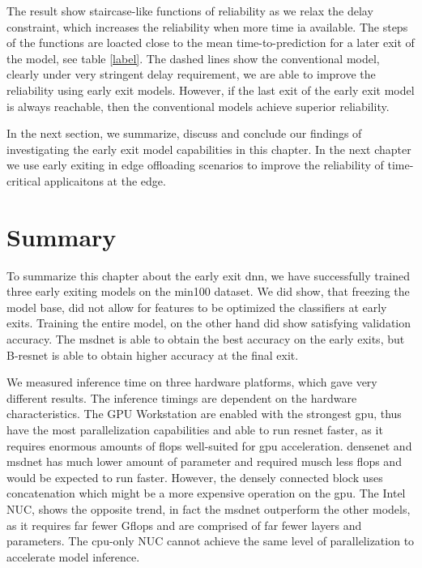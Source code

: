 The result show staircase-like functions of reliability as we relax the delay constraint, which increases the reliability when more time ia available. The steps of the functions are loacted close to the mean time-to-prediction for a later exit of the model, see table \ref{label}. The dashed lines show the conventional model, clearly under very stringent delay requirement, we are able to improve the reliability using early exit models. However, if the last exit of the early exit model is always reachable, then the conventional models achieve superior reliability. 

In the next section, we summarize, discuss and conclude our findings of investigating the early exit model capabilities in this chapter. In the next chapter we use early exiting in edge offloading scenarios to improve the reliability of time-critical applicaitons at the edge.

\section{Summary} \label{sec:ee-summary}

To summarize this chapter about the early exit \gls{dnn}, we have successfully trained three early exiting models on the \gls{min100} dataset. We did show, that freezing the model base, did not allow for features to be optimized the classifiers at early exits. Training the entire model, on the other hand did show satisfying validation accuracy. The \gls{msdnet} is able to obtain the best accuracy on the early exits, but B-\gls{resnet} is able to obtain higher accuracy at the final exit. 

We measured inference time on three hardware platforms, which gave very different results. The inference timings are dependent on the hardware characteristics. The GPU Workstation are enabled with the strongest \gls{gpu}, thus have the most parallelization capabilities and able to run \gls{resnet} faster, as it requires enormous amounts of \gls{flop}s well-suited for \gls{gpu} acceleration. \gls{densenet} and \gls{msdnet} has much lower amount of parameter and required musch less \gls{flop}s and would be expected to run faster. However, the densely connected block uses concatenation which might be a more expensive operation on the \gls{gpu}. The Intel NUC, shows the opposite trend, in fact the \gls{msdnet} outperform the other models, as it requires far fewer G\gls{flop}s and are comprised of far fewer layers and parameters. The \gls{cpu}-only NUC cannot achieve the same level of parallelization to accelerate model inference.

